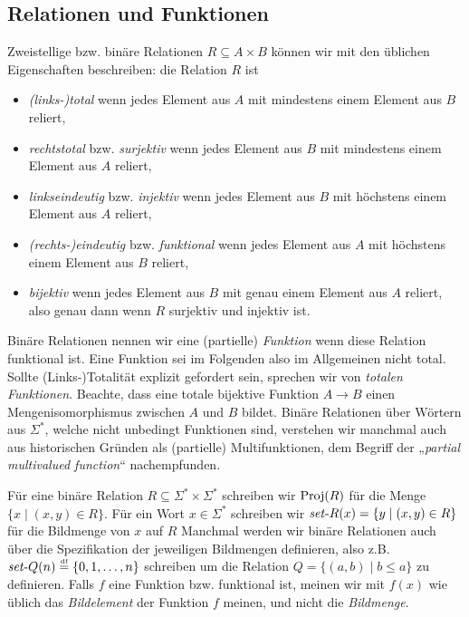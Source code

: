 \subsection*{Relationen und Funktionen}

Zweistellige bzw. binäre Relationen $R\subseteq A\times B$ können wir mit den üblichen Eigenschaften beschreiben: die Relation $R$ ist
\begin{itemize}
    \item \emph{(links-)total} wenn jedes Element aus $A$ mit mindestens einem Element aus $B$ reliert,
    \item \emph{rechtstotal} bzw. \emph{surjektiv} wenn jedes Element aus $B$ mit mindestens einem Element aus $A$ reliert,
    \item \emph{linkseindeutig} bzw. \emph{injektiv} wenn jedes Element aus $B$ mit höchstens einem Element aus $A$ reliert,
    \item \emph{(rechts-)eindeutig} bzw. \emph{funktional} wenn jedes Element aus $A$ mit höchstens einem Element aus $B$ reliert,
    \item \emph{bijektiv} wenn jedes Element aus $B$ mit genau einem Element aus $A$ reliert, also genau dann wenn $R$ surjektiv und injektiv ist.
\end{itemize}
Binäre Relationen nennen wir eine (partielle) \emph{Funktion} wenn diese Relation funktional ist. Eine Funktion sei im Folgenden also im Allgemeinen nicht total. Sollte (Links-)Totalität explizit gefordert sein, sprechen wir von \emph{totalen Funktionen}.
Beachte, dass eine totale bijektive Funktion $A\to B$ einen Mengenisomorphismus zwischen $A$ und $B$ bildet.
Binäre Relationen über Wörtern aus $\Sigma^*$, welche nicht unbedingt Funktionen sind, verstehen wir manchmal auch aus historischen Gründen als (partielle) Multifunktionen, dem Begriff der „\emph{partial multivalued function}“ nachempfunden.

Für eine binäre Relation $R\subseteq\Sigma^* \times \Sigma^*$ schreiben wir $\operatorname{Proj}(R)$ für die Menge $\{ x\mid (x,y)\in R \}$. 
Für ein Wort $x\in\Sigma^*$ schreiben wir $\mathit{set}\text{-}{}R(x)=\{ y\mid (x,y)\in R \}$ für die Bildmenge von $x$ auf $R$
Manchmal werden wir binäre Relationen auch über die Spezifikation der jeweiligen Bildmengen definieren, also z.B. $\mathit{set}\text{-}{}Q(n) \stackrel{\text{\smash{\tiny df}}}{=} \{ 0, 1, \dots, n\}$ schreiben um die Relation $Q=\{ (a,b)\mid b\leq a \}$ zu definieren.
Falls $f$ eine Funktion bzw. funktional ist, meinen wir mit $f(x)$ wie üblich das \emph{Bildelement} der Funktion $f$ meinen, und nicht die \emph{Bildmenge}. 



